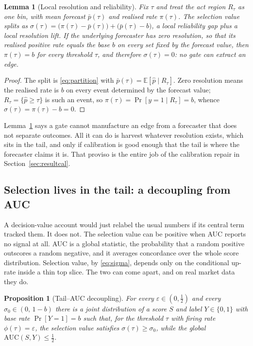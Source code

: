 \documentclass[10pt, a4paper, oneside]{article}
\theoremstyle{definition}
\theoremstyle{plain}
\newtheorem{proposition}{Proposition}
\newtheorem{lemma}{Lemma}
\newcommand{\Pup}{\hat p}
\begin{document}
\begin{lemma}[Local resolution and reliability]
\label{lem:res}
Fix $\tau$ and treat the act region $R_\tau$ as one bin, with mean forecast
$\bar p(\tau)$ and realised rate $\pi(\tau)$. The selection value splits as
$\sigma(\tau)=\big(\pi(\tau)-\bar p(\tau)\big)+\big(\bar p(\tau)-b\big)$, a local
reliability gap plus a local resolution lift. If the underlying forecaster has zero
resolution, so that its realised positive rate equals the base $b$ on every set fixed
by the forecast value, then $\pi(\tau)=b$ for every threshold $\tau$, and therefore
$\sigma(\tau)=0$: no gate can extract an edge.
\end{lemma}
\begin{proof}
The split is \eqref{eq:partition} with $\bar p(\tau)=\mathbb{E}[\Pup\mid R_\tau]$. Zero
resolution means the realised rate is $b$ on every event determined by the forecast
value; $R_\tau=\{\Pup\ge\tau\}$ is such an event, so $\pi(\tau)=\Pr[y=1\mid R_\tau]=b$,
whence $\sigma(\tau)=\pi(\tau)-b=0$.
\end{proof}

Lemma~\ref{lem:res} says a gate cannot manufacture an edge from a forecaster that does
not separate outcomes. All it can do is harvest whatever resolution exists, which sits
in the tail, and only if calibration is good enough that the tail is where the
forecaster claims it is. That proviso is the entire job of the calibration repair in
Section~\ref{sec:resultcal}.

\subsection{Selection lives in the tail: a decoupling from AUC}
\label{sec:tail}
A decision-value account would just relabel the usual numbers if its central term
tracked them. It does not. The selection value can be positive when AUC reports no
signal at all. AUC is a global statistic, the probability that a random positive
outscores a random negative, and it averages concordance over the whole score
distribution. Selection value, by \eqref{eq:sigma}, depends only on the conditional
up-rate inside a thin top slice. The two can come apart, and on real market data they
do.

\begin{proposition}[Tail--AUC decoupling]
\label{prop:tail}
For every $\varepsilon\in(0,\tfrac12)$ and every $\sigma_0\in(0,\,1-b)$ there is a
joint distribution of a score $S$ and label $Y\in\{0,1\}$ with base rate
$\Pr[Y=1]=b$ such that, for the threshold $\tau$ with firing rate $\phi(\tau)=\varepsilon$,
the selection value satisfies $\sigma(\tau)\ge\sigma_0$, while the global
$\mathrm{AUC}(S,Y)\le \tfrac12$.
\end{proposition}
\end{document}
